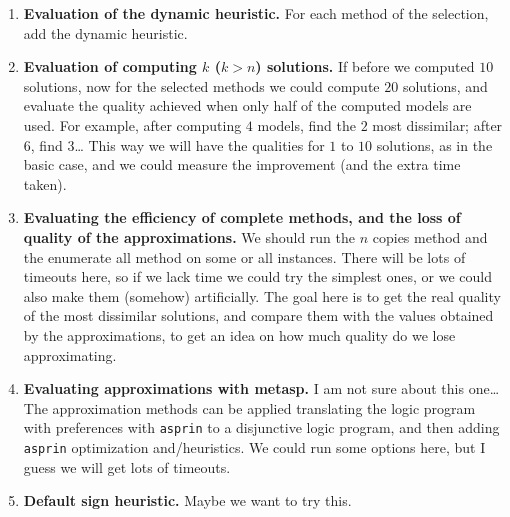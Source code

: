 \documentclass[a4paper,10pt]{article}
\begin{document}
\begin{enumerate}
\item
\textbf{Evaluation of the dynamic heuristic.}
For each method of the selection, add the dynamic heuristic.

\item
\textbf{Evaluation of computing $k$ ($k > n$) solutions.}
If before we computed $10$ solutions, now for the selected methods we could compute $20$ solutions, 
and evaluate the quality achieved when only half of the computed models are used.
For example, after computing $4$ models, find the $2$ most dissimilar; after $6$, find $3$\ldots
This way we will have the qualities for $1$ to $10$ solutions, as in the basic case, 
and we could measure the improvement (and the extra time taken).

\item
\textbf{Evaluating the efficiency of complete methods, and the loss of quality of the approximations.}
We should run the $n$ copies method and the enumerate all method on some or all instances.
There will be lots of timeouts here, so if we lack time we could try the simplest ones, 
or we could also make them (somehow) artificially.
The goal here is to get the real quality of the most dissimilar solutions, 
and compare them with the values obtained by the approximations, 
to get an idea on how much quality do we lose approximating.

\item
\textbf{Evaluating approximations with metasp.}
I am not sure about this one\ldots
The approximation methods can be applied translating the logic program with preferences
with \texttt{asprin} to a disjunctive logic program, 
and then adding \texttt{asprin} optimization and/heuristics. 
We could run some options here, but I guess we will get lots of timeouts.

\item
\textbf{Default sign heuristic.} 
Maybe we want to try this. 
\end{enumerate}
\end{document}
